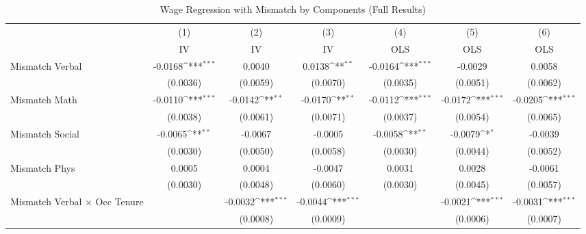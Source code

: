 {
\def\sym#1{\ifmmode^{#1}\else\(^{#1}\)\fi}
\begin{longtable}{l*{6}{c}}
\caption{Wage Regression with Mismatch by Components (Full Results)}\\
\hline  \endfirsthead\hline  \endhead\hline  \endfoot\endlastfoot
                    &\multicolumn{1}{c}{(1)}&\multicolumn{1}{c}{(2)}&\multicolumn{1}{c}{(3)}&\multicolumn{1}{c}{(4)}&\multicolumn{1}{c}{(5)}&\multicolumn{1}{c}{(6)}\\
                    &\multicolumn{1}{c}{IV}&\multicolumn{1}{c}{IV}&\multicolumn{1}{c}{IV}&\multicolumn{1}{c}{OLS}&\multicolumn{1}{c}{OLS}&\multicolumn{1}{c}{OLS}\\
\hline  
Mismatch Verbal     &     -0.0168\sym{***}&      0.0040         &      0.0138\sym{**} &     -0.0164\sym{***}&     -0.0029         &      0.0058         \\
                    &    (0.0036)         &    (0.0059)         &    (0.0070)         &    (0.0035)         &    (0.0051)         &    (0.0062)         \\
Mismatch Math       &     -0.0110\sym{***}&     -0.0142\sym{**} &     -0.0170\sym{**} &     -0.0112\sym{***}&     -0.0172\sym{***}&     -0.0205\sym{***}\\
                    &    (0.0038)         &    (0.0061)         &    (0.0071)         &    (0.0037)         &    (0.0054)         &    (0.0065)         \\
Mismatch Social     &     -0.0065\sym{**} &     -0.0067         &     -0.0005         &     -0.0058\sym{**} &     -0.0079\sym{*}  &     -0.0039         \\
                    &    (0.0030)         &    (0.0050)         &    (0.0058)         &    (0.0030)         &    (0.0044)         &    (0.0052)         \\
Mismatch Phys       &      0.0005         &      0.0004         &     -0.0047         &      0.0031         &      0.0028         &     -0.0061         \\
                    &    (0.0030)         &    (0.0048)         &    (0.0060)         &    (0.0030)         &    (0.0045)         &    (0.0057)         \\
Mismatch Verbal $\times$ Occ Tenure&                     &     -0.0032\sym{***}&     -0.0044\sym{***}&                     &     -0.0021\sym{***}&     -0.0031\sym{***}\\
                    &                     &    (0.0008)         &    (0.0009)         &                     &    (0.0006)         &    (0.0007)         \\

\end{longtable}}
